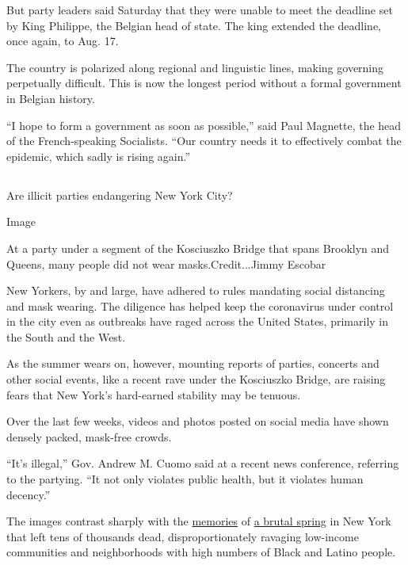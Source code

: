 But party leaders said Saturday that they were unable to meet the
deadline set by King Philippe, the Belgian head of state. The king
extended the deadline, once again, to Aug. 17.

The country is polarized along regional and linguistic lines, making
governing perpetually difficult. This is now the longest period without
a formal government in Belgian history.

``I hope to form a government as soon as possible,'' said Paul Magnette,
the head of the French-speaking Socialists. ``Our country needs it to
effectively combat the epidemic, which sadly is rising again.''

\hypertarget{section-11}{%
\subsection{}\label{section-11}}

Are illicit parties endangering New York City?

Image

At a party under a segment of the Kosciuszko Bridge that spans Brooklyn
and Queens, many people did not wear masks.Credit...Jimmy Escobar

New Yorkers, by and large, have adhered to rules mandating social
distancing and mask wearing. The diligence has helped keep the
coronavirus under control in the city even as outbreaks have raged
across the United States, primarily in the South and the West.

As the summer wears on, however, mounting reports of parties, concerts
and other social events, like a recent rave under the Kosciuszko Bridge,
are raising fears that New York's hard-earned stability may be tenuous.

Over the last few weeks, videos and photos posted on social media have
shown densely packed, mask-free crowds.

``It's illegal,'' Gov. Andrew M. Cuomo said at a recent news conference,
referring to the partying. ``It not only violates public health, but it
violates human decency.''

The images contrast sharply with the
\href{https://www.nytimes.com/2020/08/07/style/coronavirus-nyc-historic-season.html}{memories}
of
\href{https://www.nytimes.com/2020/04/04/nyregion/coronavirus-hospital-brooklyn.html}{a
brutal spring} in New York that left tens of thousands dead,
disproportionately ravaging low-income communities and neighborhoods
with high numbers of Black and Latino people.


